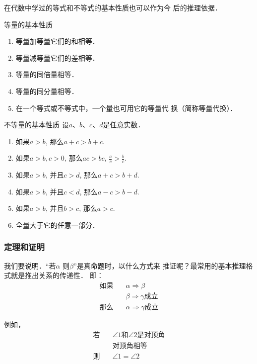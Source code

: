 在代数中学过的等式和不等式的基本性质也可以作为今
后的推理依据．
\begin{blk}{等量的基本性质}
\begin{enumerate}
	\item 等量加等量它们的和相等．
	\item  等量减等量它们的差相等．
	\item 等量的同倍量相等．
	\item 等量的同分量相等．
	\item 在一个等式或不等式中，一个量也可用它的等量代
	换（简称等量代换）．
\end{enumerate}
\end{blk}

\begin{blk}{不等量的基本性质}
	设$a$、$b$、$c$、$d$是任意实数．
\begin{enumerate}
\item 如果$a>b$, 那么$a+c>b+c$.
\item 如果$a>b, c>0$, 那么$ac>bc$, $\frac{a}{c}>\frac{b}{c}$.
\item  如果$a>b$, 并且$c>d$, 那么$a+c>b+d$.
\item 如果$a>b$, 并且$c<d$, 那么$a-c>b-d$.
\item 如果$a>b$, 并且$b>c$, 那么$a>c$.
\item 全量大于它的任意一部分．
\end{enumerate}
\end{blk}

\subsubsection{定理和证明}
我们要说明．“若$\alpha$ 则$\beta$”是真命题时，以什么方式来
推证呢？最常用的基本推理格式就是推出关系的传递性．
即：
\begin{align*}
	\text{如果}& \quad \alpha \Rightarrow \beta \tag{1}\\
	& \quad \beta \Rightarrow \gamma \text{成立} \tag{2}\\
\text{那么}&  \quad \alpha \Rightarrow \gamma \text{成立}\tag{3}
\end{align*}

例如，
\begin{align*}
	\text{若}& \quad \text{$\angle 1$和$\angle 2$是对顶角} \tag{1}\\
	& \quad \text{对顶角相等} \tag{2}\\
\text{则}&  \quad \angle 1=\angle 2 \tag{3}
\end{align*}

